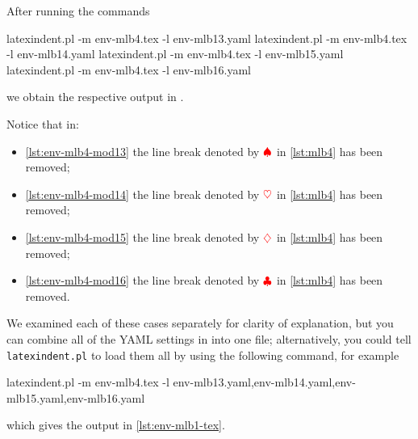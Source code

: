 \begin{example}
  After running the commands  

  \begin{commandshell}
latexindent.pl -m env-mlb4.tex -l env-mlb13.yaml
latexindent.pl -m env-mlb4.tex -l env-mlb14.yaml
latexindent.pl -m env-mlb4.tex -l env-mlb15.yaml
latexindent.pl -m env-mlb4.tex -l env-mlb16.yaml
\end{commandshell}

  we obtain the respective output in .

  \begin{cmhtcbraster}
  \end{cmhtcbraster}

  \begin{cmhtcbraster}
  \end{cmhtcbraster}

  Notice that in:
  \begin{itemize}
   \item \cref{lst:env-mlb4-mod13} the line break denoted by $\color{red}\spadesuit$ in
         \cref{lst:mlb4} has been removed;
   \item \cref{lst:env-mlb4-mod14} the line break denoted by $\color{red}\heartsuit$ in
         \cref{lst:mlb4} has been removed;
   \item \cref{lst:env-mlb4-mod15} the line break denoted by $\color{red}\diamondsuit$ in
         \cref{lst:mlb4} has been removed;
   \item \cref{lst:env-mlb4-mod16} the line break denoted by $\color{red}\clubsuit$ in
         \cref{lst:mlb4} has been removed.
  \end{itemize}
  We examined each of these cases separately for clarity of explanation, but you can
  combine all of the YAML settings in  into one
  file; alternatively, you could tell \texttt{latexindent.pl} to load them all by using
  the following command, for example  
  \begin{widepage}

   \begin{commandshell}
latexindent.pl -m env-mlb4.tex -l env-mlb13.yaml,env-mlb14.yaml,env-mlb15.yaml,env-mlb16.yaml
\end{commandshell}

  \end{widepage}
  which gives the output in \vref{lst:env-mlb1-tex}.
  \end{example}

